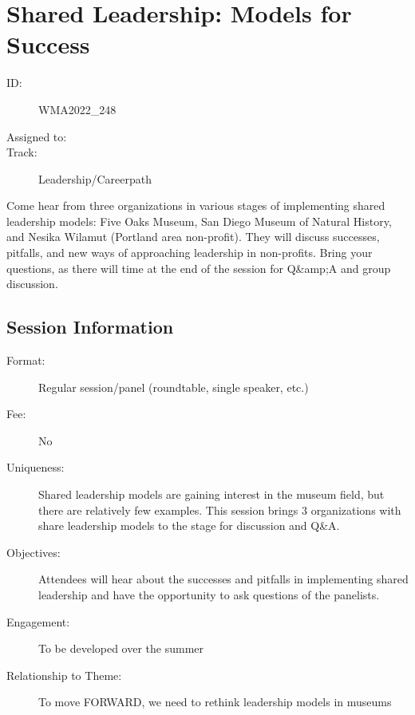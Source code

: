 \documentclass{report}
\begin{document}
        
          \newpage
          \section{ Shared Leadership: Models for Success }
            \begin{description}
              \item [ID:]
              WMA2022\_248

              \item [Assigned to:]
                \item [Track:]Leadership/Careerpath~
              \end{description}

              Come hear from three organizations in various stages of implementing shared leadership models: Five Oaks Museum, San Diego Museum of Natural History, and Nesika Wilamut (Portland area non-profit). They will discuss successes, pitfalls, and new ways of approaching leadership in non-profits. Bring your questions, as there will time at the end of the session for Q\&amp;A and group discussion.

              \subsection*{Session Information}
                \begin{description}
                  \item [Format:] Regular session/panel (roundtable, single speaker, etc.)
							    
								  \item [Fee:]No
							     
							    \item [Uniqueness:]Shared leadership models are gaining interest in the museum field, but there are relatively few examples. This session brings 3 organizations with share leadership models to the stage for discussion and Q&A.
							    \item [Objectives:]Attendees will hear about the successes and pitfalls in implementing shared leadership and have the opportunity to ask questions of the panelists.
							    \item [Engagement:]To be developed over the summer
							    \item [Relationship to Theme:]To move FORWARD, we need to rethink leadership models in museums
							    
                \end{description}
\end{document}
